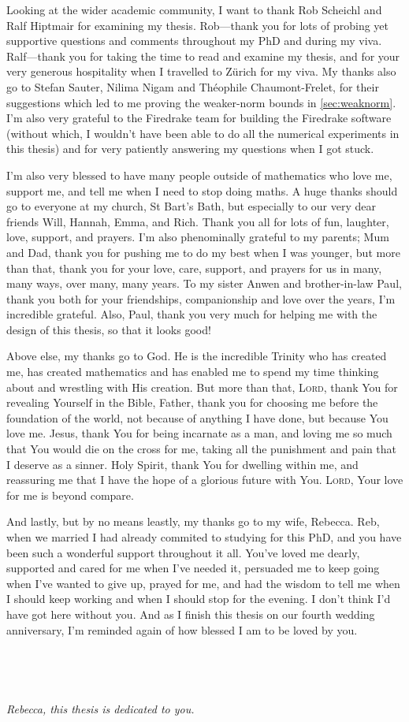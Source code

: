 {  Looking at the wider academic community, I want to thank Rob Scheichl and Ralf Hiptmair for examining my thesis. Rob---thank you for lots of probing yet supportive questions and comments throughout my PhD and during my viva. Ralf---thank you for taking the time to read and examine my thesis, and for your very generous hospitality when I travelled to Z\"urich for my viva. My thanks also go to Stefan Sauter, Nilima Nigam and Th\'eophile Chaumont-Frelet, for their suggestions which led to me proving the weaker-norm bounds in \cref{sec:weaknorm}. I'm also very grateful to the Firedrake team for building the Firedrake software (without which, I wouldn't have been able to do all the numerical experiments in this thesis) and for very patiently answering my questions when I got stuck.
  
I'm also very blessed to have many people outside of mathematics who love me, support me, and tell me when I need to stop doing maths. A huge thanks should go to everyone at my church, St Bart's Bath, but especially to our very dear friends Will, Hannah, Emma, and Rich. Thank you all for lots of fun, laughter, love, support, and prayers. I'm also phenominally grateful to my parents; Mum and Dad, thank you for pushing me to do my best when I was younger, but more than that, thank you for your love, care, support, and prayers for us in many, many ways, over many, many years. To my sister Anwen and brother-in-law Paul, thank you both for your friendships, companionship and love over the years, I'm incredible grateful. Also, Paul, thank you very much for helping me with the design of this thesis, so that it looks good!

Above else, my thanks go to God. He is the incredible Trinity who has created me, has created mathematics and has enabled me to spend my time thinking about and wrestling with His creation. But more than that, L\textsc{ord}, thank You for revealing Yourself in the Bible, Father, thank you for choosing me before the foundation of the world, not because of anything I have done, but because You love me. Jesus, thank You for being incarnate as a man, and loving me so much that You would die on the cross for me, taking all the punishment and pain that I deserve as a sinner. Holy Spirit, thank You for dwelling within me, and reassuring me that I have the hope of a glorious future with You. L\textsc{ord}, Your love for me is beyond compare.
\thispagestyle{plain} %

And lastly, but by no means leastly, my thanks go to my wife, Rebecca. Reb, when we married I had already commited to studying for this PhD, and you have been such a wonderful support throughout it all. You've loved me dearly, supported and cared for me when I've needed it, persuaded me to keep going when I've wanted to give up, prayed for me, and had the wisdom to tell me when I should keep working and when I should stop for the evening. I don't think I'd have got here without you. And as I finish this thesis on our fourth wedding anniversary, I'm reminded again of how blessed I am to be loved by you.

\

\

\begin{center}
  {\it Rebecca, this thesis is dedicated to you.}
  \end{center}
}
